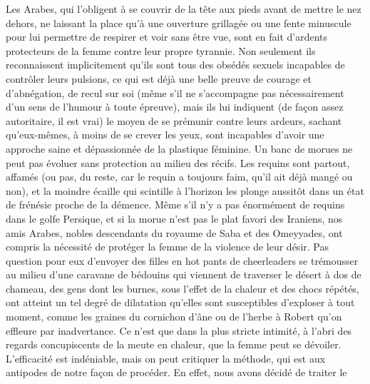 Les Arabes, qui l’obligent à se couvrir de la tête aux pieds avant de mettre le nez dehors, ne laissant la place qu’à une ouverture grillagée ou une fente minuscule pour lui permettre de respirer et voir sans être vue, sont en fait d’ardents protecteurs de la femme contre leur propre tyrannie. Non seulement ils reconnaissent implicitement qu’ils sont tous des obsédés sexuels incapables de contrôler leurs pulsions, ce qui est déjà une belle preuve de courage et d’abnégation, de recul sur soi (même s’il ne s’accompagne pas nécessairement d’un sens de l’humour à toute épreuve), mais ils lui indiquent (de façon assez autoritaire, il est vrai) le moyen de se prémunir contre leurs ardeurs, sachant qu’eux-mêmes, à moins de se crever les yeux, sont incapables d’avoir une approche saine et dépassionnée de la plastique féminine. Un banc de morues ne peut pas évoluer sans protection au milieu des récifs. Les requins sont partout, affamés (ou pas, du reste, car le requin a toujours faim, qu’il ait déjà mangé ou non), et la moindre écaille qui scintille à l’horizon les plonge aussitôt dans un état de frénésie proche de la démence. Même s’il n’y a pas énormément de requins dans le golfe Persique, et si la morue n’est pas le plat favori des Iraniens, nos amis Arabes, nobles descendants du royaume de Saba et des Omeyyades, ont compris la nécessité de protéger la femme de la violence de leur désir. Pas question pour eux d’envoyer des filles en \foreignlanguage{english}{hot pants} de cheerleaders se trémousser au milieu d’une caravane de bédouins qui viennent de traverser le désert à dos de chameau, des gens dont les burnes, sous l’effet de la chaleur et des chocs répétés, ont atteint un tel degré de dilatation qu’elles sont susceptibles d’exploser à tout moment, comme les graines du cornichon d’âne ou de l’herbe à Robert qu’on effleure par inadvertance. Ce n’est que dans la plus stricte intimité, à l’abri des regards concupiscents de la meute en chaleur, que la femme peut se dévoiler. L’efficacité est indéniable, mais on peut critiquer la méthode, qui est aux antipodes de notre façon de procéder. En effet, nous avons décidé de traiter le 